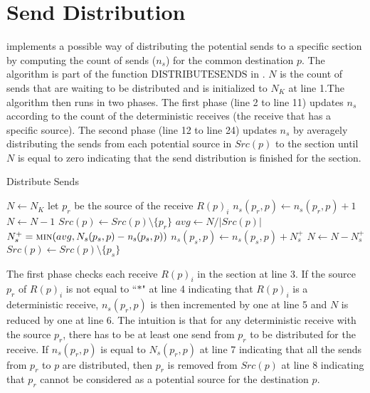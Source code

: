 \section{Send Distribution}

 implements a possible way of distributing the potential sends to a specific section by computing the count of sends ($n_s$) for the common destination $p$. The algorithm is part of the function $\mathrm{DISTRIBUTESENDS}$ in . $N$ is the count of sends that are waiting to be distributed and is initialized to $N_K$ at line 1.The algorithm then runs in two phases. The first phase (line 2 to line 11) updates $n_s$ according to the count of the deterministic receives (the receive that has a specific source). The second phase (line 12 to line 24) updates $n_s$ by averagely distributing the sends from each potential source in $Src(p)$ to the section until $N$ is equal to zero indicating that the send distribution is finished for the section. 

\begin{algorithm}
\caption{Distribute Sends}\label{algo:distribute}
\begin{algorithmic}[1]
\State $N\gets N_K$
\State let $p_{r}$ be the source of the receive $R(p)_i$
\State $\mathit{n_s}(p_{r},p)\gets \mathit{n_s}(p_{r},p)+1$
\State $N\gets N-1$   
\State $Src(p)\gets Src(p)\setminus\{p_{r}\}$
\EndIf
\EndIf
\EndFor
\State $\mathit{avg}\gets N / {|Src(p)|}$
\State $N_s^+ = \Call{min}{avg,N_s(p_{s},p)-\mathit{n_s}(p_{s},p)}$
\State $\mathit{n_s}(p_{s},p)\gets\mathit{n_s}(p_{s},p)+N_s^+$
\State $N\gets N-N_s^+$
\State $Src(p)\gets Src(p)\setminus\{p_{s}\}$
\EndIf
\EndIf
\EndFor
\EndWhile
\end{algorithmic}
\end{algorithm}

The first phase checks each receive $R(p)_i$ in the section at line 3. If the source $p_r$ of $R(p)_i$ is not equal to ``$\ast$" at line 4 indicating that $R(p)_i$ is a deterministic receive, $n_s(p_r,p)$ is then incremented by one at line 5 and $N$ is reduced by one at line 6. The intuition is that for any deterministic receive with the source $p_r$, there has to be at least one send from $p_r$ to be distributed for the receive. If $n_s(p_r,p)$ is equal to $N_s(p_r,p)$ at line 7 indicating that all the sends from $p_r$ to $p$ are distributed, then $p_r$ is removed from $Src(p)$ at line 8 indicating that $p_r$ cannot be considered as a potential source for the destination $p$. 

